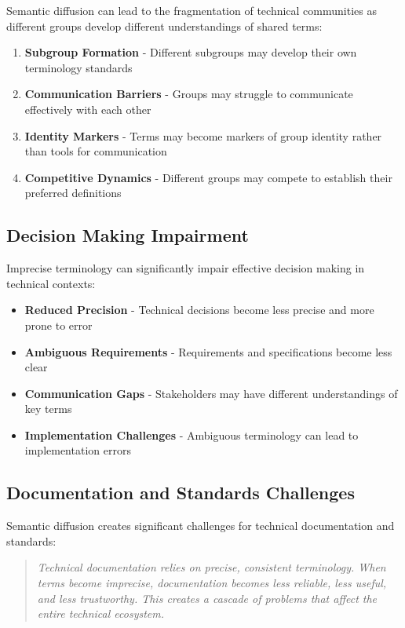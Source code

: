 \documentclass[11pt]{article}
\begin{document}
Semantic diffusion can lead to the fragmentation of technical communities as different groups develop different understandings of shared terms:

\begin{enumerate}
\item \textbf{Subgroup Formation} - Different subgroups may develop their own terminology standards
\item \textbf{Communication Barriers} - Groups may struggle to communicate effectively with each other
\item \textbf{Identity Markers} - Terms may become markers of group identity rather than tools for communication
\item \textbf{Competitive Dynamics} - Different groups may compete to establish their preferred definitions
\end{enumerate}

\subsection{Decision Making Impairment}

Imprecise terminology can significantly impair effective decision making in technical contexts:

\begin{itemize}
\item \textbf{Reduced Precision} - Technical decisions become less precise and more prone to error
\item \textbf{Ambiguous Requirements} - Requirements and specifications become less clear
\item \textbf{Communication Gaps} - Stakeholders may have different understandings of key terms
\item \textbf{Implementation Challenges} - Ambiguous terminology can lead to implementation errors
\end{itemize}

\subsection{Documentation and Standards Challenges}

Semantic diffusion creates significant challenges for technical documentation and standards:

\begin{quote}
\emph{Technical documentation relies on precise, consistent terminology. When terms become imprecise, documentation becomes less reliable, less useful, and less trustworthy. This creates a cascade of problems that affect the entire technical ecosystem.}
\end{quote}
\end{document}
